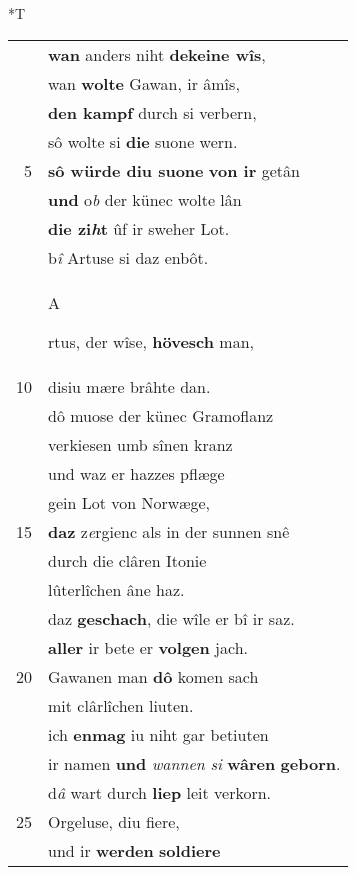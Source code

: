 \documentclass[8pt,a4paper,notitlepage]{article}
\begin{document}
\begin{table}[ht]
\begin{minipage}[t]{0.5\linewidth}
\end{minipage}
\hspace{0.5cm}
\begin{minipage}[t]{0.5\linewidth}
\small
\begin{center}*T
\end{center}
\begin{tabular}{rl}
 & \textbf{wan} anders niht \textbf{dekeine wîs},\\ 
 & wan \textbf{wolte} Gawan, ir âmîs,\\ 
 & \textbf{den kampf} durch si verbern,\\ 
 & sô wolte si \textbf{die} suone wern.\\ 
5 & \textbf{sô würde diu suone} \textbf{von ir} getân\\ 
 & \textbf{und} o\textit{b} der künec wolte lân\\ 
 & \textbf{die zi\textit{h}t} ûf ir sweher Lot.\\ 
 & b\textit{î} Artuse si daz enbôt.\\ 
 & \begin{large}A\end{large}rtus, der wîse, \textbf{hövesch} man,\\ 
10 & disiu mære brâhte dan.\\ 
 & dô muose der künec Gramoflanz\\ 
 & verkiesen umb sînen kranz\\ 
 & und waz er hazzes pflæge\\ 
 & gein Lot von Norwæge,\\ 
15 & \textbf{daz} z\textit{e}rgienc als in der sunnen snê\\ 
 & durch die clâren Itonie\\ 
 & lûterlîchen âne haz.\\ 
 & daz \textbf{geschach}, die wîle er bî ir saz.\\ 
 & \textbf{aller} ir bete er \textbf{volgen} jach.\\ 
20 & Gawanen man \textbf{dô} komen sach\\ 
 & mit clârlîchen liuten.\\ 
 & ich \textbf{en}\textbf{mag} iu niht gar betiuten\\ 
 & ir namen \textbf{und} \textit{wannen si} \textbf{wâren} \textbf{geborn}.\\ 
 & d\textit{â} wart durch \textbf{liep} leit verkorn.\\ 
25 & Orgeluse, diu fiere,\\ 
 & und ir \textbf{werden} \textbf{soldiere}\\ 

\end{tabular}
\end{minipage}
\end{table}
\end{document}
